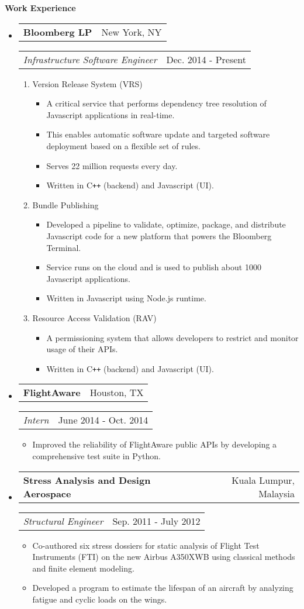 \documentclass[letterpaper,11pt]{article}
\makeatletter
\newcommand{\resitem}[1]{\item #1 \vspace{-2pt}}
\newcommand{\resheading}[1]{{\begin{mdframed}[backgroundcolor=mygray]{\large \textbf{#1}}\end{mdframed}}}
\newcommand{\restitle}[2]{
\begin{tabular*}{7.1in}{l@{\extracolsep{\fill}}r}
		\textbf{#1} & #2 \\
\end{tabular*}}
\newcommand{\ressubtitle}[2]{
\begin{tabular*}{7.1in}{l@{\extracolsep{\fill}}r}
		\emph{#1} & #2 \\
\end{tabular*}\vspace{-6pt}}
\makeatother
\begin{document}
\resheading{Work Experience}
\begin{itemize}

\item
	\restitle{Bloomberg LP}{New York, NY}
	\ressubtitle{Infrastructure Software Engineer}{Dec. 2014 - Present}
	\begin{enumerate}
		\item{Version Release System (VRS)}
		\begin{itemize}
			\resitem{A critical service that performs dependency tree resolution
			         of Javascript applications in real-time.}
			\resitem{This enables automatic software update and targeted
			         software deployment based on a flexible set of rules.}
			\resitem{Serves 22 million requests every day.}
			\resitem{Written in C\texttt{++} (backend) and Javascript (UI).}
		\end{itemize}
		\item{Bundle Publishing}
		\begin{itemize}
			\resitem{Developed a pipeline to validate, optimize, package, and
			         distribute Javascript code for a new platform that powers
					 the Bloomberg Terminal.}
			\resitem{Service runs on the cloud and is used to publish about 1000
			         Javascript applications.}
			\resitem{Written in Javascript using Node.js runtime.}
		\end{itemize}
		\item{Resource Access Validation (RAV)}
		\begin{itemize}
			\resitem{A permissioning system that allows developers to restrict
			         and monitor usage of their APIs.}
			\resitem{Written in C\texttt{++} (backend) and Javascript (UI).}
		\end{itemize}
	\end{enumerate}

\item
	\restitle{FlightAware}{Houston, TX}
	\ressubtitle{Intern}{June 2014 - Oct. 2014}
	\begin{itemize}
		\resitem{Improved the reliability of FlightAware public APIs by
		         developing a comprehensive test suite in Python.}
	\end{itemize}

\item
	\restitle{Stress Analysis and Design Aerospace}{Kuala Lumpur, Malaysia}
	\ressubtitle{Structural Engineer}{Sep. 2011 - July 2012}
	\begin{itemize}
		\resitem{Co-authored six stress dossiers for static analysis of
		         Flight Test Instruments (FTI) on the new Airbus A350XWB
		         using classical methods and finite element modeling.}
		\resitem{Developed a program to estimate the lifespan of an aircraft by
		         analyzing fatigue and cyclic loads on the wings.}
	\end{itemize}

\end{itemize}
\end{document}
